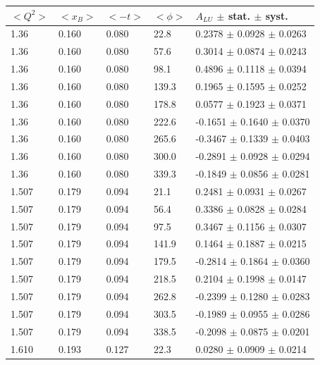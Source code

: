 \documentclass[aps,prc,preprint,superscriptaddress]{revtex4}
\begin{document}
\begin{table}[!h]
   \begin{center}
      \begin{tabular}{||l|l|l|l|l||}
         \hline
 $<Q^{2}>$ & $<x_{B}>$ & $<-t>$ & $<\phi>$ & $A_{LU}$ $\pm$ stat. $\pm$ syst.\\
  \hline
  1.36 & 0.160 & 0.080  & 22.8  &  0.2378 $\pm$ 0.0928 $\pm$ 0.0263 \\
  1.36 & 0.160 & 0.080  & 57.6  &  0.3014 $\pm$ 0.0874 $\pm$ 0.0243 \\
  1.36 & 0.160 & 0.080  & 98.1  &  0.4896 $\pm$ 0.1118 $\pm$ 0.0394 \\
  1.36 & 0.160 & 0.080  & 139.3 &  0.1965 $\pm$ 0.1595 $\pm$ 0.0252 \\
  1.36 & 0.160 & 0.080  & 178.8 &  0.0577 $\pm$ 0.1923 $\pm$ 0.0371 \\
  1.36 & 0.160 & 0.080  & 222.6 & -0.1651 $\pm$ 0.1640 $\pm$ 0.0370 \\
  1.36 & 0.160 & 0.080  & 265.6 & -0.3467 $\pm$ 0.1339 $\pm$ 0.0403 \\
  1.36 & 0.160 & 0.080  & 300.0 & -0.2891 $\pm$ 0.0928 $\pm$ 0.0294 \\
  1.36 & 0.160 & 0.080  & 339.3 & -0.1849 $\pm$ 0.0856 $\pm$ 0.0281 \\
  \hline                                                                
  1.507 & 0.179 & 0.094 & 21.1  &  0.2481 $\pm$ 0.0931 $\pm$ 0.0267 \\ 
  1.507 & 0.179 & 0.094 & 56.4  &  0.3386 $\pm$ 0.0828 $\pm$ 0.0284 \\ 
  1.507 & 0.179 & 0.094 & 97.5  &  0.3467 $\pm$ 0.1156 $\pm$ 0.0307 \\ 
  1.507 & 0.179 & 0.094 & 141.9 &  0.1464 $\pm$ 0.1887 $\pm$ 0.0215 \\ 
  1.507 & 0.179 & 0.094 & 179.5 & -0.2814 $\pm$ 0.1864 $\pm$ 0.0360 \\ 
  1.507 & 0.179 & 0.094 & 218.5 &  0.2104 $\pm$ 0.1998 $\pm$ 0.0147 \\ 
  1.507 & 0.179 & 0.094 & 262.8 & -0.2399 $\pm$ 0.1280 $\pm$ 0.0283 \\ 
  1.507 & 0.179 & 0.094 & 303.5 & -0.1989 $\pm$ 0.0955 $\pm$ 0.0286 \\ 
  1.507 & 0.179 & 0.094 & 338.5 & -0.2098 $\pm$ 0.0875 $\pm$ 0.0201 \\ 
  \hline                                                                                                                 
  1.610 & 0.193 & 0.127 & 22.3  &  0.0280 $\pm$ 0.0909 $\pm$ 0.0214 \\

\end{tabular}
\end{center}
\end{table}
\end{document}
